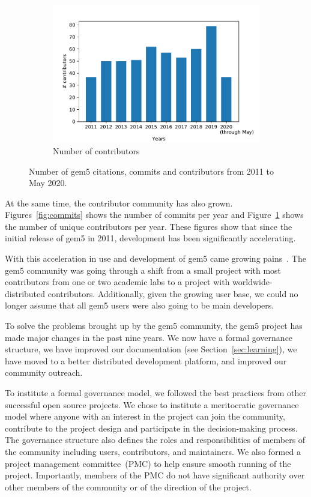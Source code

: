 \begin{figure}
    \begin{subfigure}{0.28\linewidth}
      \centering
      \includegraphics[width=\linewidth]{fig/gem5_contributors}
      \caption{Number of contributors}
      \label{fig:contributors}
    \end{subfigure}
    \caption{Number of gem5 citations, commits and contributors from 2011 to May 2020.}
    \label{fig:gem5_citations_commits_contributors}
\end{figure}

At the same time, the contributor community has also grown.
Figures~\ref{fig:commits} shows the number of commits per year and Figure~\ref{fig:contributors} shows the number of unique contributors per year.
These figures show that since the initial release of gem5 in 2011, development has been significantly accelerating.

With this acceleration in use and development of gem5 came growing pains~\cite{Power-gem5horrors-2015}.
The gem5 community was going through a shift from a small project with most contributors from one or two academic labs to a project with worldwide-distributed contributors.
Additionally, given the growing user base, we could no longer assume that all gem5 users were also going to be main developers.

To solve the problems brought up by the gem5 community, the gem5 project has made major changes in the past nine years.
We now have a formal governance structure, we have improved our documentation (see Section~\ref{sec:learning}), we have moved to a better distributed development platform, and improved our community outreach.

To institute a formal governance model, we followed the best practices from other successful open source projects.
We chose to institute a meritocratic governance model where anyone with an interest in the project can join the community, contribute to the project design and participate in the decision-making process.
The governance structure also defines the roles and responsibilities of members of the community including users, contributors, and maintainers.
We also formed a project management committee~(PMC) to help ensure smooth running of the project.
Importantly, members of the PMC do not have significant authority over other members of the community or of the direction of the project.

